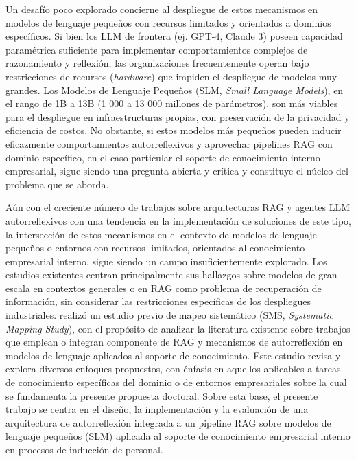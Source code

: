 Un desafío poco explorado concierne al despliegue de estos mecanismos en modelos de lenguaje pequeños con recursos limitados y orientados a dominios específicos. Si bien los LLM de frontera (ej. GPT-4, Claude 3) poseen capacidad paramétrica suficiente para implementar comportamientos complejos de razonamiento y reflexión, las organizaciones frecuentemente operan bajo restricciones de recursos (\textit{hardware}) que impiden el despliegue de modelos muy grandes. Los Modelos de Lenguaje Pequeños (SLM, \textit{Small Language Models}), en el rango de 1B a 13B (1 000 a 13 000 millones de parámetros), son más viables para el despliegue en infraestructuras propias, con preservación de la privacidad y eficiencia de costos. No obstante, si estos modelos más pequeños pueden inducir eficazmente comportamientos autorreflexivos y aprovechar pipelines RAG con dominio específico, en el caso particular el soporte de conocimiento interno empresarial, sigue siendo una pregunta abierta y crítica y constituye el núcleo del problema que se aborda.

Aún con el creciente número de trabajos sobre arquitecturas RAG y agentes LLM autorreflexivos con una tendencia en la implementación de soluciones de este tipo, la intersección de estos mecanismos en el contexto de modelos de lenguaje pequeños o entornos con recursos limitados, orientados al conocimiento empresarial interno, sigue siendo un campo insuficientemente explorado. Los estudios existentes centran principalmente sus hallazgos sobre modelos de gran escala en contextos generales o en RAG como problema de recuperación de información, sin considerar las restricciones específicas de los despliegues industriales. \textcite{Alcides2026} realizó un estudio previo de mapeo sistemático (SMS, \textit{Systematic Mapping Study}), con el propósito de analizar la literatura existente sobre trabajos que emplean o integran componente de RAG y mecanismos de autorreflexión en modelos de lenguaje aplicados al soporte de conocimiento. Este estudio revisa y explora diversos enfoques propuestos, con énfasis en aquellos aplicables a tareas de conocimiento específicas del dominio o de entornos empresariales sobre la cual se fundamenta la presente propuesta doctoral. Sobre esta base, el presente trabajo se centra en el diseño, la implementación y la evaluación de una arquitectura de autorreflexión integrada a un pipeline RAG sobre modelos de lenguaje pequeños (SLM) aplicada al soporte de conocimiento empresarial interno en procesos de inducción de personal.

